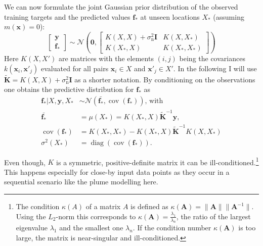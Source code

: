 \documentclass[11pt,a4paper,twoside,BCOR=15mm]{scrreprt}
\newcommand{\vc}[1]{\bm{#1}}
\newcommand{\mat}[1]{\bm{#1}}
\DeclareMathOperator{\cov}{cov}
\DeclareMathOperator{\diag}{diag}
\newcommand{\ped}[1]{_{\mathrm{#1}}}
\begin{document}
We can now formulate the joint Gaussian prior distribution of the observed 
training targets and the predicted values $\vc f_*$ at unseen locations $X_*$ 
(assuming $m(\vc x) = 0$):
\begin{equation}
    \left[ \begin{array}{c}\vc y \\ \vc f_* \end{array} \right]
    \sim \mathcal{N}\left(\vc 0,
        \left[ \begin{array}{cc}
            K(X, X) + \sigma\ped{n}^2 \mat I & K(X, X_*) \\ K(X_*, X) & K(X_*, 
            X_*)
        \end{array} \right]
    \right)
\end{equation}
Here $K(X, X')$ are matrices with the elements $(i, j)$ being the covariances 
$k(\vc x_i, \vc x'_j)$ evaluated for all pairs $\vc x_i \in X$ and $\vc x'_j \in 
X'$. In the following I will use $\tilde{\mat K} = K(X, X) + \sigma\ped{n}^2 
\mat I$ as a shorter notation. By conditioning on the observations one obtains 
the predictive distribution for $\vc f_*$ as
\begin{align}
    \vc f_* | X, \vc y, X_* &\sim \mathcal{N}(\bar{\vc f_*}, \cov(\vc 
    f_*))\text{, with}\\
    \bar{\vc f_*} &= \mu(X_*) = K(X_*, X)\tilde{\mat K}^{-1} \vc y\text{,} \\
    \cov(\vc f_*) &= K(X_*, X_*) - K(X_*, X)\tilde{\mat K}^{-1}K(X, X_*) 
    \\
    \sigma^2(X_*) &= \diag(\cov(\vc f_*)) \text{.}
\end{align}

Even though, $K$ is a symmetric, positive-definite matrix it can be 
ill-conditioned.\footnote{The condition $\kappa(A)$ of a matrix $A$ is defined 
    as $\kappa(\mat A) = \|\mat A\| \|\mat A^{-1}\|$. Using the $L_2$-norm this 
    corresponds to $\kappa(\mat A) = \frac{\lambda_1}{\lambda_n}$,
    the ratio of the largest eigenvalue $\lambda_1$ and the smallest one
    $\lambda_n$. If the condition number $\kappa(\mat A)$ is too large, the 
    matrix is near-singular and ill-conditioned.} This happens especially for 
close-by input data points as they occur in a sequential scenario like the plume 
modelling here.
\end{document}
